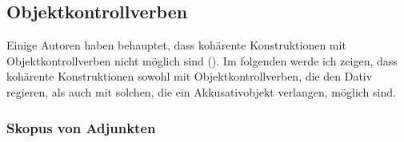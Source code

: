 \subsection{Objektkontrollverben}
\label{sec-obj-control-phen}

Einige Autoren haben behauptet, dass kohärente Konstruktionen mit Objektkontrollverben
nicht möglich sind (\citealp[]{Sternefeld85b}).
Im folgenden werde ich zeigen, dass kohärente Konstruktionen sowohl mit Objektkontrollverben,
die den Dativ regieren, als auch mit solchen, die ein Akkusativobjekt verlangen, möglich
sind.

\subsubsection{Skopus von Adjunkten}
\label{sec-obj-contr-scope}

